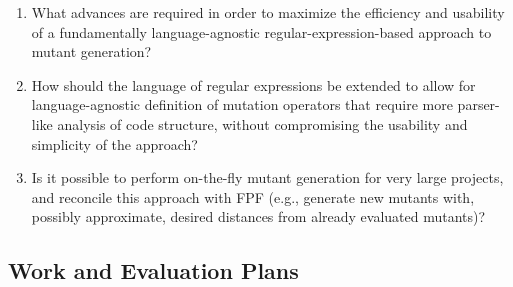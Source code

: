 \begin{enumerate}
\item What advances are required in order to maximize the efficiency and usability of a
  fundamentally language-agnostic regular-expression-based approach to
  mutant generation?
\item How should the language of regular expressions be extended to allow
  for language-agnostic definition of mutation operators that require
  more parser-like analysis of code structure, without compromising
  the usability and simplicity of the approach?
\item Is it possible to perform on-the-fly mutant generation for very
  large projects, and reconcile this approach with FPF (e.g., generate
  new mutants with, possibly approximate, desired distances from
  already evaluated mutants)?
\end{enumerate}

\subsection{Work and Evaluation Plans}
\label{sec:workplan}

